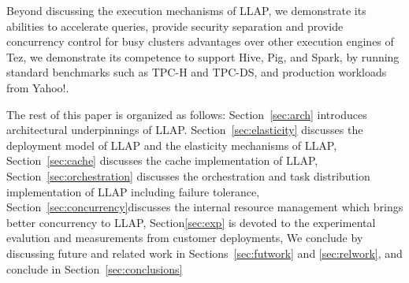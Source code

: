 Beyond discussing the execution mechanisms of LLAP, we demonstrate its abilities to accelerate queries, provide security separation and provide concurrency control for busy clusters advantages over other execution engines of Tez, we demonstrate its competence to support Hive, Pig, and Spark, by running standard benchmarks such as TPC-H and TPC-DS, and production workloads from Yahoo!. 

The rest of this paper is organized as follows: 
Section~\ref{sec:arch} introduces architectural underpinnings of LLAP. 
Section~\ref{sec:elasticity} discusses the deployment model of LLAP and the elasticity mechanisms of LLAP, 
Section~\ref{sec:cache} discusses the cache implementation of LLAP, 
Section~\ref{sec:orchestration} discusses the orchestration and task distribution implementation of LLAP including failure tolerance,
Section~\ref{sec:concurrency}discusses the internal resource management which brings better concurrency to LLAP,
Section\ref{sec:exp} is devoted to the experimental evalution and measurements from customer deployments,
We conclude by discussing future and related work in Sections~\ref{sec:futwork} and \ref{sec:relwork}, 
and conclude in Section~\ref{sec:conclusions}
